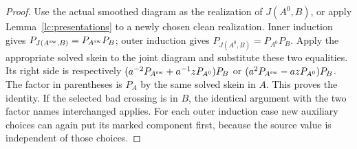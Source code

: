 \begin{proof}
Use the actual smoothed diagram as the realization of $J(A^0,B)$, or
apply Lemma~\ref{lc:presentations} to a newly chosen clean realization. Inner
induction gives $P_{J(A^{\rm sw},B)}=P_{A^{\rm sw}}P_B$; outer
induction gives $P_{J(A^0,B)}=P_{A^0}P_B$. Apply the appropriate solved
skein to the joint diagram and substitute these two equalities. Its
right side is respectively
$(a^{-2}P_{A^{\rm sw}}+a^{-1}zP_{A^0})P_B$ or
$(a^2P_{A^{\rm sw}}-azP_{A^0})P_B$. The factor in parentheses is
$P_A$ by the same solved skein in $A$. This proves the identity. If
the selected bad crossing is in $B$, the identical argument with the
two factor names interchanged applies. For each outer induction case
new auxiliary choices can again put its marked component first,
because the source value is independent of those choices.
\end{proof}

